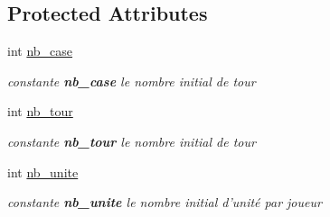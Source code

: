 \subsection*{Protected Attributes}
\begin{DoxyCompactItemize}
\item 
\hypertarget{class_small_world_1_1_monteur_partie_a44a0c5d06ba0529da7ded15eeae110b0}{int \hyperlink{class_small_world_1_1_monteur_partie_a44a0c5d06ba0529da7ded15eeae110b0}{nb\-\_\-case}}\label{class_small_world_1_1_monteur_partie_a44a0c5d06ba0529da7ded15eeae110b0}

\begin{DoxyCompactList}\small\item\em constante {\bfseries nb\-\_\-case} le nombre initial de tour \end{DoxyCompactList}\item 
\hypertarget{class_small_world_1_1_monteur_partie_a063951c1b42071c88f4354541ac31dfc}{int \hyperlink{class_small_world_1_1_monteur_partie_a063951c1b42071c88f4354541ac31dfc}{nb\-\_\-tour}}\label{class_small_world_1_1_monteur_partie_a063951c1b42071c88f4354541ac31dfc}

\begin{DoxyCompactList}\small\item\em constante {\bfseries nb\-\_\-tour} le nombre initial de tour \end{DoxyCompactList}\item 
\hypertarget{class_small_world_1_1_monteur_partie_a051496e5be6c5f21de6519605ea4c5a7}{int \hyperlink{class_small_world_1_1_monteur_partie_a051496e5be6c5f21de6519605ea4c5a7}{nb\-\_\-unite}}\label{class_small_world_1_1_monteur_partie_a051496e5be6c5f21de6519605ea4c5a7}

\begin{DoxyCompactList}\small\item\em constante {\bfseries nb\-\_\-unite} le nombre initial d'unité par joueur \end{DoxyCompactList}\end{DoxyCompactItemize}
